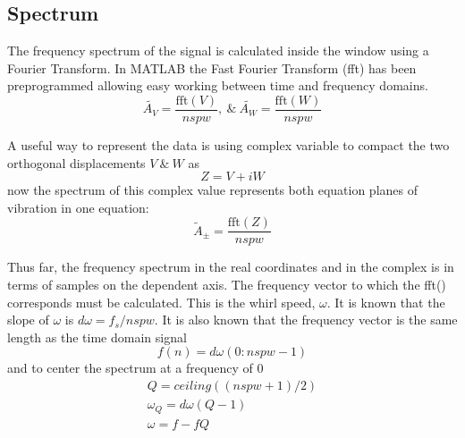 \subsection{Spectrum}
The frequency spectrum of the signal is calculated inside the window using a Fourier Transform. In MATLAB the Fast Fourier Transform (fft) has been preprogrammed allowing easy working between time and frequency domains.
\begin{equation}\label{eq:FFTReal}
\tilde{A_V} = \frac{\text{fft}(V)}{nspw},\ \&\ \tilde{A_W} = \frac{\text{fft}(W)}{nspw}
\end{equation}\par 
A useful way to represent the data is using complex variable to compact the two orthogonal displacements $ V\ \&\ W $ as
\begin{equation}\label{eq:ComplexDisplacement}
Z = V + iW
\end{equation}
now the spectrum of this complex value represents both equation planes of vibration in one equation:
\begin{equation}\label{eq:FFTComplex}
\tilde{A}_\pm = \frac{\text{fft}(Z)}{nspw}
\end{equation}\par
Thus far, the frequency spectrum in the real coordinates and in the complex is in terms of samples on the dependent axis. The frequency vector to which the fft() corresponds must be calculated. This is the whirl speed, $ \omega $. It is known that the slope of $ \omega $ is $ d\omega=f_s/nspw $. It is also known that the frequency vector is the same length as the time domain signal 
\begin{equation*}
f(n)=d\omega(0:nspw-1)
\end{equation*}
and to center the spectrum at a frequency of 0
\begin{equation*}
\begin{array}{c}
Q=ceiling((nspw+1)/2)\\
\omega_Q=d\omega(Q-1)\\
\omega=f-fQ
\end{array}
\end{equation*}
